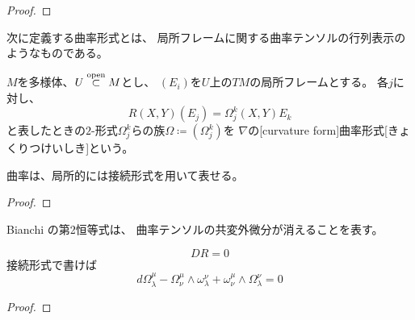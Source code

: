 \documentclass[report]{jlreq}
\begin{document}
\begin{proof}
    \TODO{}
\end{proof}

次に定義する曲率形式とは、
局所フレームに関する曲率テンソルの行列表示のようなものである。

\begin{definition}[曲率形式]
    $M$を多様体、$U \stackrel{\text{open}}{\subset} M$とし、
    $(E_i)$を$U$上の$TM$の局所フレームとする。
    各$j$に対し、
    \begin{equation}
        R(X, Y)(E_j) = \Omega^k_j(X, Y) E_k
    \end{equation}
    と表したときの$2$-形式$\Omega^k_j$らの族$\Omega \coloneqq (\Omega^k_j)$を
    $\nabla$の[curvature form]{曲率形式}[きょくりつけいしき]という。
\end{definition}

曲率は、局所的には接続形式を用いて表せる。


\begin{proof}
    \TODO{}
\end{proof}

Bianchi の第2恒等式は、
曲率テンソルの共変外微分が消えることを表す。

\begin{proposition}
    \begin{equation}
        DR = 0
    \end{equation}
    接続形式で書けば
    \begin{equation}
        d\Omega^\mu_\lambda
            - \Omega^\mu_\nu \wedge \omega^\nu_\lambda
            + \omega^\mu_\nu \wedge \Omega^\nu_\lambda
            = 0
    \end{equation}
    \TODO{}
\end{proposition}

\begin{proof}
    \TODO{}
\end{proof}
\end{document}
